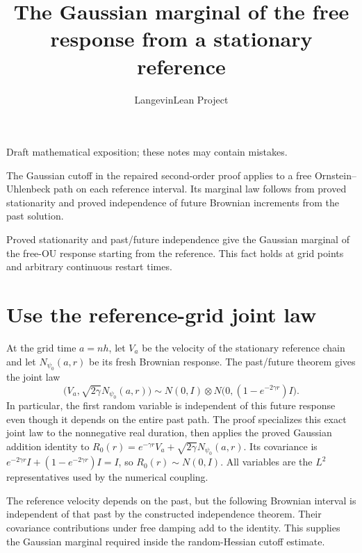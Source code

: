\documentclass[11pt,a4paper]{article}
\title{\texorpdfstring{The Gaussian marginal of the free response from a stationary reference}{The Gaussian marginal of the free response from a stationary reference}}
\author{LangevinLean Project}
\date{}
\begin{document}
\maketitle
Draft mathematical exposition; these notes may contain mistakes.


The Gaussian cutoff in the repaired second-order proof applies to a free Ornstein–Uhlenbeck path on each reference interval. Its marginal law follows from proved stationarity and proved independence of future Brownian increments from the past solution.



Proved stationarity and past/\allowbreak{}future independence give the Gaussian marginal of the free-OU response starting from the reference. This fact holds at grid points and arbitrary continuous restart times.


\section{\texorpdfstring{Use the reference-grid joint law}{Use the reference-grid joint law}}


At the grid time \(a=nh\), let \(V_a\) be the velocity of the stationary reference chain and let \(N_{\psi_0}(a,r)\) be its fresh Brownian response. The past/\allowbreak{}future theorem gives the joint law \[\bigl(V_a,\sqrt{2\gamma}N_{\psi_0}(a,r)\bigr)\sim N(0,I)\otimes N\bigl(0,(1-e^{-2\gamma r})I\bigr).\] In particular, the first random variable is independent of this future response even though it depends on the entire past path. The proof specializes this exact joint law to the nonnegative real duration, then applies the proved Gaussian addition identity to \(R_0(r)=e^{-\gamma r}V_a+\sqrt{2\gamma}N_{\psi_0}(a,r)\). Its covariance is \(e^{-2\gamma r}I+(1-e^{-2\gamma r})I=I\), so \(R_0(r)\sim N(0,I)\). All variables are the \(L^{2}\) representatives used by the numerical coupling.



The reference velocity depends on the past, but the following Brownian interval is independent of that past by the constructed independence theorem. Their covariance contributions under free damping add to the identity. This supplies the Gaussian marginal required inside the random-Hessian cutoff estimate.
\end{document}
